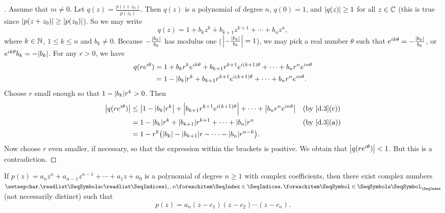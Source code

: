 \begin{proof}[]
  Assume that \(m \neq 0\).
  Let \(q(z) = \frac{p(z + z_0)}{p(z_0)}\).
  Then \(q(z)\) is a polynomial of degree \(n\), \(q(0) = 1\), and \(\left\lvert q(z)\right\rvert \geq 1\) for all \(z \in \mathbb{C}\)
  (this is true since \(\left\lvert p(z + z_0)\right\rvert \geq \left\lvert p(z_0)\right\rvert\)).
  So we may write
  \[
    q(z) = 1 + b_k z^k + b_{k + 1} z^{k + 1} + \cdots + b_n z^n,
  \]
  where \(k \in \mathbb{N}\), \(1 \leq k \leq n\) and \(b_k \neq 0\).
  Because \(-\frac{\left\lvert b_k\right\rvert}{b_k}\) has modulus one (\(\left\lvert-\frac{\left\lvert b_k\right\rvert}{b_k}\right\rvert = 1\)), we may pick a real number \(\theta\) such that \(e^{i k \theta} = - \frac{\left\lvert b_k\right\rvert}{b_k}\), or \(e^{i k \theta} b_k = -\abs{b_k}\).
  For any \(r > 0\), we have
  \begin{align*}
    q(r e^{i \theta}) & = 1 + b_k r^k e^{i k \theta} + b_{k + 1} r^{k + 1} e^{i (k + 1) \theta} + \cdots + b_n r^n e^{i n \theta} \\
                      & = 1 - \abs{b_k} r^k + b_{k + 1} r^{k + 1} e^{i (k + 1) \theta} + \cdots + b_n r^n e^{i n \theta}.
  \end{align*}
  Choose \(r\) small enough so that \(1 - \abs{b_k} r^k > 0\).
  Then
  \begin{align*}
    \abs{q(r e^{i \theta})} & \leq \abs{1 - \abs{b_k} r^k} + \abs{b_{k + 1} r^{k + 1} e^{i (k + 1) \theta}} + \cdots + \abs{b_n r^n e^{i n \theta}} &  & \text{(by \cref{d.3}(c))} \\
                            & = 1 - \abs{b_k} r^k + \abs{b_{k + 1}} r^{k + 1} + \cdots + \abs{b_n} r^n                                              &  & \text{(by \cref{d.3}(a))} \\
                            & = 1 - r^k \pa{\abs{b_k} - \abs{b_{k + 1}} r - \cdots - \abs{b_n} r^{n - k}}.
  \end{align*}
  Now choose \(r\) even smaller, if necessary, so that the expression within the brackets is positive.
  We obtain that \(\left\lvert q(r e^{i \theta})\right\rvert < 1\).
  But this is a contradiction.
\end{proof}

\begin{cor}\label{d.0.7}
  If \(p(z) = a_n z^n + a_{n - 1} z^{n - 1} + \cdots + a_1 z + a_0\) is a polynomial of degree \(n \geq 1\) with complex coefficients, then there exist complex numbers \(\seq{c}{1,,n}\) (not necessarily distinct) such that
  \[
    p(z) = a_n (z - c_1)(z - c_2) \cdots (z - c_n).
  \]
\end{cor}


